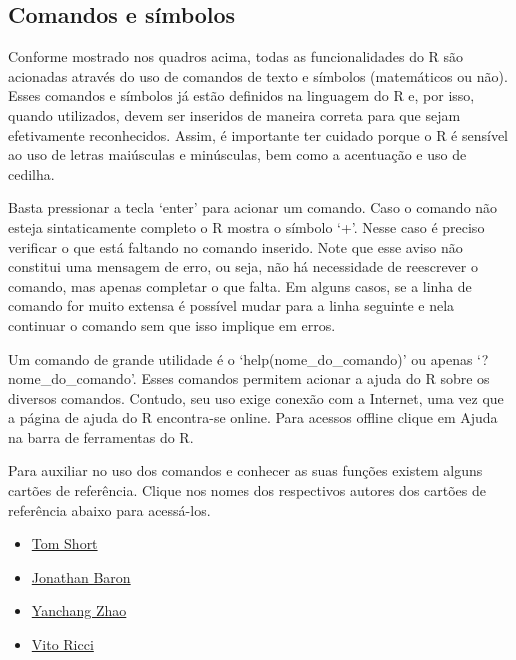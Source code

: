 \documentclass[]{book}
\providecommand{\tightlist}{%
  \setlength{\itemsep}{0pt}\setlength{\parskip}{0pt}}
\begin{document}
\subsection{Comandos e símbolos}\label{comandos-e-simbolos}

Conforme mostrado nos quadros acima, todas as funcionalidades do R são
acionadas através do uso de comandos de texto e símbolos (matemáticos ou
não). Esses comandos e símbolos já estão definidos na linguagem do R e,
por isso, quando utilizados, devem ser inseridos de maneira correta para
que sejam efetivamente reconhecidos. Assim, é importante ter cuidado
porque o R é sensível ao uso de letras maiúsculas e minúsculas, bem como
a acentuação e uso de cedilha.

Basta pressionar a tecla `enter' para acionar um comando. Caso o comando
não esteja sintaticamente completo o R mostra o símbolo `+'. Nesse caso
é preciso verificar o que está faltando no comando inserido. Note que
esse aviso não constitui uma mensagem de erro, ou seja, não há
necessidade de reescrever o comando, mas apenas completar o que falta.
Em alguns casos, se a linha de comando for muito extensa é possível
mudar para a linha seguinte e nela continuar o comando sem que isso
implique em erros.

Um comando de grande utilidade é o `help(nome\_do\_comando)' ou apenas
`?nome\_do\_comando'. Esses comandos permitem acionar a ajuda do R sobre
os diversos comandos. Contudo, seu uso exige conexão com a Internet, uma
vez que a página de ajuda do R encontra-se online. Para acessos offline
clique em Ajuda na barra de ferramentas do R.

Para auxiliar no uso dos comandos e conhecer as suas funções existem
alguns cartões de referência. Clique nos nomes dos respectivos autores
dos cartões de referência abaixo para acessá-los.

\begin{itemize}
\tightlist
\item
  \href{http://cran.r-project.org/doc/contrib/Short-refcard.pdf}{Tom
  Short}
\item
  \href{http://www.psych.upenn.edu/~baron/refcard.pdf}{Jonathan Baron}
\item
  \href{http://cran.r-project.org/doc/contrib/YanchangZhao-refcard-data-mining.pdf}{Yanchang
  Zhao}
\item
  \href{http://cran.r-project.org/doc/contrib/Ricci-refcard-regression.pdf}{Vito
  Ricci}
\end{itemize}
\end{document}
